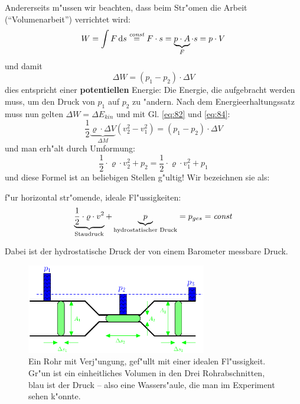 Andererseits m"ussen wir beachten, dass beim Str"omen die Arbeit
("`Volumenarbeit"') verrichtet wird:
\begin{equation}
   \label{eq:83}
   W =  \int F \, \mathrm{d} s \stackrel{\text{\emph{const}}}{=} F \cdot s = \underbrace{p \cdot A}_F
   \cdot s = p \cdot V
\end{equation}
und damit
\begin{equation}
   \label{eq:84}
   \Delta W = (p_1 - p_2) \cdot \Delta V
\end{equation}
dies entspricht einer \textbf{potentiellen} Energie: Die Energie, die
aufgebracht werden muss, um den Druck von $p_1$ auf $p_2$ zu
"andern. Nach dem Energieerhaltungssatz muss nun gelten $\Delta W =
\Delta E_{kin}$ und mit Gl. \eqref{eq:82} und \eqref{eq:84}:
\begin{equation}
   \label{eq:85}
   \frac{1}{2} \underbrace{\varrho \cdot \Delta
     V}_{\Delta M} ( v_2^2 - v_1^2 )  = (p_1 - p_2) \cdot \Delta V   
\end{equation}
und man erh"alt durch Umformung:
\begin{equation}
   \label{eq:86}
  \frac{1}{2} \cdot \varrho \cdot v_2^2 + p_2 = \frac{1}{2} \cdot
   \varrho \cdot v_1^2 + p_1 
\end{equation}
und diese Formel ist an beliebigen Stellen g"ultig! Wir bezeichnen sie
als:
\begin{Wichtig}
    f"ur
   horizontal str"omende, ideale Fl"ussigkeiten:
   \begin{equation}
      \label{eq:87}
        \underbrace{\frac{1}{2} \cdot \varrho \cdot
          v^2}_\text{Staudruck} + \underbrace{p}_\text{hydrostatischer
        Druck} =  p_{ges} = \text{\emph{const}}
   \end{equation}
\end{Wichtig}
Dabei ist der hydrostatische Druck der von einem Barometer messbare
Druck.
\begin{figure}
   \centering
   \includegraphics[width=0.7\textwidth]{bilder/rohr_verjuengung}
   \caption[Ideale Flüssigkeit in untersch. dickem Rohr]{Ein Rohr
     mit Verj"ungung, gef"ullt mit einer idealen Fl"ussigkeit. Gr"un
     ist ein einheitliches Volumen in den Drei Rohrabschnitten, blau
     ist der Druck -- also eine Wassers"aule, die man im Experiment
     sehen k"onnte.}
   \label{abb_rohr_verjuengung}
\end{figure}



